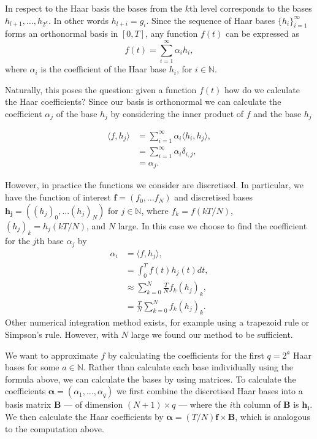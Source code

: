 \documentclass[12pt]{book} %
\begin{document}
In respect to the Haar basis the bases from the $k$th level corresponds to the bases $h_{l+1}, \dots, h_{2^k}$. In other words $h_{l+i} = g_{i}$. Since the sequence of Haar bases $\{h_i\}_{i=1}^{\infty}$ forms an orthonormal basis in $[0,T]$, any function $f(t)$ can be expressed as 
$$
f(t) = \sum^{\infty}_{i=1}  \alpha_{i} h_i,
$$
where $\alpha_i$ is the coefficient of the Haar base $h_i$, for $i \in \mathbb{N}.$

Naturally, this poses the question: given a function $f(t)$ how do we calculate the Haar coefficients? Since our basis is orthonormal we can calculate the coefficient $\alpha_j$ of the base $h_j$ by considering the inner product of $f$ and the base $h_j$ 

\begin{align*}
\langle f,h_j\rangle &= \sum^\infty_{i=1} \alpha_i \langle h_i,h_j\rangle, \\
&= \sum^\infty_{i=1} \alpha_i \delta_{i,j}, \\
&= \alpha_j.
 \end{align*}
 
 However, in practice the functions we consider are discretised. In particular, we have the function of interest $\mathbf{f} = (f_0,\dots f_N)$ and discretised bases $\mathbf{h_j} = ((h_j)_0, \dots (h_j)_N)$ for $j \in \mathbb{N}$, where $f_k = f(kT/N)$, $(h_j)_k = h_j(kT/N)$, and $N$ large. In this case we choose to find the coefficient for the $j$th base $\alpha_j$ by
 \begin{align*}
\alpha_i &= \langle f,h_j\rangle, \\
&= \int^T_0 f(t)h_j(t) dt, \\
&\approx \sum^N_{k=0} \frac{T}{N}f_k (h_j)_k, \\
&= \frac{T}{N}\sum^N_{k=0} f_k (h_j)_k.
 \end{align*}
Other numerical integration method exists, for example using a  trapezoid rule or Simpson's rule. However, with $N$ large we found our method to be sufficient. 


We want to approximate $f$ by calculating the coefficients for the first $q = 2^a$ Haar bases for some $a \in \mathbb{N}$. Rather than calculate each base individually using the formula above, we can calculate the bases by using matrices. To calculate the coefficients $\bm{\alpha} = (\alpha_1, \dots, \alpha_q)$ we first combine the discretised Haar bases into a basis matrix $\mathbf{B}$ --- of dimension $(N+1) \times q$ ---  where the $i$th column of $\mathbf{B}$ is $\mathbf{h_i}$. We then calculate the Haar coefficients by $\bm{\alpha} = (T/N) \mathbf{f}  \times \mathbf{B}$, which is analogous to the computation above. 
\end{document}
